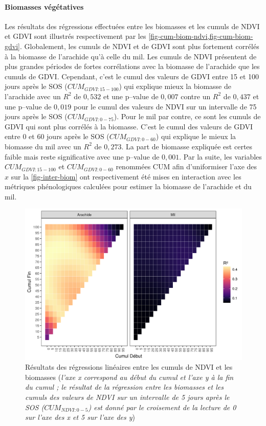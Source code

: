 \paragraph{Biomasses végétatives} 

Les résultats des régressions effectuées entre les biomasses
et les cumuls de NDVI et GDVI sont illustrés respectivement par les \cref{fig-cum-biom-ndvi,fig-cum-biom-gdvi}. Globalement, les cumuls de NDVI et de GDVI sont plus fortement corrélés à la biomasse de l’arachide qu’à celle du mil. Les cumuls de NDVI présentent de plus grandes périodes de fortes corrélations avec la biomasse de l’arachide que les cumuls de GDVI. Cependant, c’est le cumul des valeurs de GDVI entre 15 et 100 jours après le SOS ($CUM_{GDVI:15-100}$) qui explique mieux la biomasse de l’arachide avec un $R^{2}$ de $0,532$ et une p--value de $0,007$ contre un $R^{2}$ de $0,437$ et une p--value de $0,019$ pour le cumul des valeurs de NDVI sur un intervalle de 75 jours après le SOS ($CUM_{GDVI:0-75}$). Pour le mil par contre, ce sont les cumuls de GDVI qui sont plus corrélés à la biomasse. C’est le cumul des valeurs de GDVI entre 0 et 60 jours après le SOS ($CUM_{GDVI:0-60}$) qui explique le mieux la biomasse du mil avec un $R^{2}$ de $0,273$. La part de biomasse expliquée est certes faible mais reste significative avec une p--value de $0, 001$. Par la suite, les variables $CUM_{GDVI:15-100}$ et $CUM_{GDVI:0-60}$ renommées CUM afin d’uniformiser l’axe des $x$ sur la \cref{fig-inter-biom} ont respectivement été mises en interaction avec les métriques phénologiques calculées pour estimer la biomasse de l’arachide et du mil.

\begin{figure}[htbp]
 \begin{center}
  \includegraphics[scale=0.7]{resultats_discussions/Cum_Biom_NDVI.png} 
 \end{center}
 \caption[Régressions linéaires entre cumuls de NDVI et biomasses]{Résultats des régressions linéaires entre les cumuls de NDVI et les biomasses (\emph{l’axe x correspond au début du cumul et l’axe y à la fin du cumul ; le résultat de la régression entre les biomasses et les cumuls des valeurs de NDVI sur un intervalle de 5 jours après le SOS ($CUM_{NDVI:0-5}$) est donné par le croisement de la lecture de 0 sur l’axe des x et 5 sur l’axe des y})}
 \label{fig-cum-biom-ndvi}
\end{figure}

